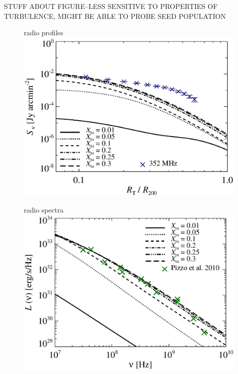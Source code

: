 \documentclass[fleqn,usenatbib,useAMS]{mnras}
\begin{document}
STUFF ABOUT FIGURE--LESS SENSITIVE TO PROPERTIES OF TURBULENCE, MIGHT BE ABLE TO PROBE SEED POPULATION 
\begin{figure}
\begin{minipage}{1\columnwidth}
   \begin{center}\Large{radio profiles}\\
     \includegraphics[width=\columnwidth]{tcltD.prof.comp.KrTTDth.Xtu.eps}
   \end{center}
\end{minipage}
\begin{minipage}{1\columnwidth}
   \begin{center}\Large{radio spectra}\\
     \includegraphics[width=\columnwidth]{tcltD.spec.comp.KrTTDth.Xtu.eps}

\end{center}
\end{minipage}
\end{figure}
\end{document}
